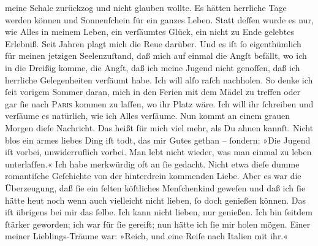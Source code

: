 {\begin{ledgroupsized}[t]{13cm}
               meine Schale zurückzog und nicht glauben wollte. Es hätten herrliche Tage werden
               können und Sonnenſchein für ein ganzes Leben. Statt deſſen wurde es nur, wie Alles in
               meinem Leben, ein verſäumtes Glück, ein nicht zu Ende gelebtes Erlebniß. Seit Jahren
               plagt mich die Reue darüber. Und es iſt ſo eigenthümlich für meinen jetzigen
               Seelenzuſtand, daß mich auf einmal die Angſt befällt, wo ich in die Dreißig komme,
               die Angſt, daß ich \strikeout{\textcolor{gray}{d}} meine Jugend nicht genoſſen, daß ich herrliche Gelegenheiten verſäumt habe.
               Ich will alſo raſch nachholen. So denke ich ſeit vorigem Sommer daran, mich in den
               Ferien {\pb}mit dem Mädel zu treffen oder gar ſie nach \textsc{Paris} kommen zu laſſen, wo ihr Platz wäre. Ich will ihr ſchreiben und verſäume es
               natürlich, wie ich Alles verſäume. Nun kommt an einem grauen Morgen dieſe Nachricht.
               Das heißt für mich viel mehr, als Du ahnen kannſt. Nicht blos ein armes liebes Ding iſt todt, das mir Gutes
               gethan – ſondern: »Die Jugend iſt vorbei, unwiderruflich vorbei. Man lebt nicht
               wieder, was man einmal zu leben unterlaſſen.«\pend
           \pstart
           Ich habe merkwürdig oft an ſie gedacht. Nicht etwa dieſe dumme romantiſche Geſchichte
               von der hinterdrein kommenden Liebe. Aber  es war
               die Überzeugung, daß ſie ein
               ſelten köſtliches Menſchenkind geweſen {\pb}und daß ich ſie hätte
                  heut noch wenn auch vielleicht nicht lieben, ſo
               doch genießen können. Das iſt übrigens bei mir das ſelbe. Ich kann nicht lieben, nur
               genießen. Ich bin ſeitdem ſtärker geworden; ich war für ſie gereift; nun hätte ich
               ſie mir holen mögen. Einer meiner Lieblings-Träume war: »Reich, und eine Reiſe nach
                  Italien mit ihr.«\pend

\end{ledgroupsized}}
